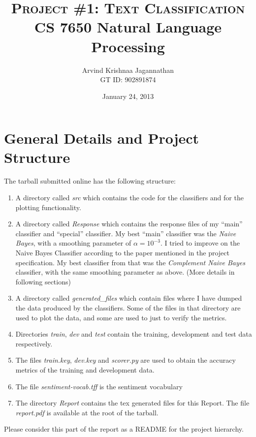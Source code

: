 \documentclass[10pt, letter]{article}
\newcommand{\doctitle}{%
CS 7650 Natural Language Processing}
\begin{document}
\title{\textsc{Project \#1: Text Classification} \\ \textbf{\doctitle}}
  \author {Arvind Krishnaa Jagannathan \\ GT ID: 902891874}
   \date{January 24, 2013}
\maketitle

\section*{General Details and Project Structure}
The tarball submitted online has the following structure:
\begin{enumerate}
	\item A directory called \textit{src} which contains the code for the classifiers and for the plotting functionality.
	\item A directory called \textit{Response} which contains the response files of my ``main'' classifier and ``special'' classifier. My best ``main'' classifier was the \emph{Naive Bayes}, with a smoothing parameter of $\alpha = 10^{-3}$. I tried to improve on the Naive Bayes Classifier according to the paper \cite{rennie2003tackling} mentioned in the project specification. My best classifier from that was the \emph{Complement Naive Bayes} classifier, with the same smoothing parameter as above. (More details in following sections)
	\item A directory called \textit{generated\_files} which contain files where I have dumped the data produced by the classifiers. Some of the files in that directory are used to plot the data, and some are used to just to verify the metrics.
	\item Directories \textit{train}, \textit{dev} and \textit{test} contain the training, development and test data respectively.
	\item The files \textit{train.key}, \textit{dev.key} and \textit{scorer.py} are used to obtain the accuracy metrics of the training and development data.
	\item The file \textit{sentiment-vocab.tff} is the sentiment vocabulary \cite{wilson2009recognizing}
	\item The directory \textit{Report} contains the tex generated files for this Report. The file \textit{report.pdf} is available at the root of the tarball.
\end{enumerate}
Please consider this part of the report as a README for the project hierarchy.
\end{document}
